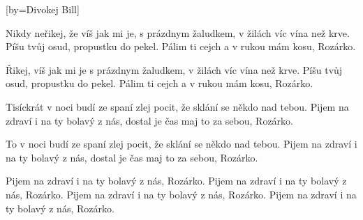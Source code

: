[by={Divokej Bill}]

\beginverse{}
Nikdy neřikej, že víš jak mi je, s prázdnym
žaludkem, v žilách víc vína než krve.
Píšu tvůj osud, propustku do pekel.
Pálim ti cejch a v rukou mám kosu, Rozárko.
\endverse{}

\beginverse{}
\chordsoff{}
Řikej, víš jak mi je s prázdnym
žaludkem, v žilách víc vína než krve.
Píšu tvůj osud, propustku do pekel.
Pálim ti cejch a v rukou mám kosu, Rozárko.
\chordson{}
\endverse{}

\beginverse{}
\chordsoff{}
Tisíckrát v noci budí ze spaní zlej
pocit, že sklání se někdo nad tebou.
Pijem na zdraví i na ty bolavý z nás,
dostal je čas maj to za sebou, Rozárko.
\chordson{}
\endverse{}

\beginverse{}
\chordsoff{}
To v noci budí ze spaní zlej
pocit, že sklání se někdo nad tebou.
Pijem na zdraví i na ty bolavý z nás,
dostal je čas maj to za sebou, Rozárko.
\chordson{}
\endverse{}

\beginverse{}
\chordsoff{}
Pijem na zdraví i na ty bolavý z nás, Rozárko.
Pijem na zdraví i na ty bolavý z nás, Rozárko.
Pijem na zdraví i na ty bolavý z nás, Rozárko.
Pijem na zdraví i na ty bolavý z nás, Rozárko.
\chordson{}
\endverse{}

\endsong{}
